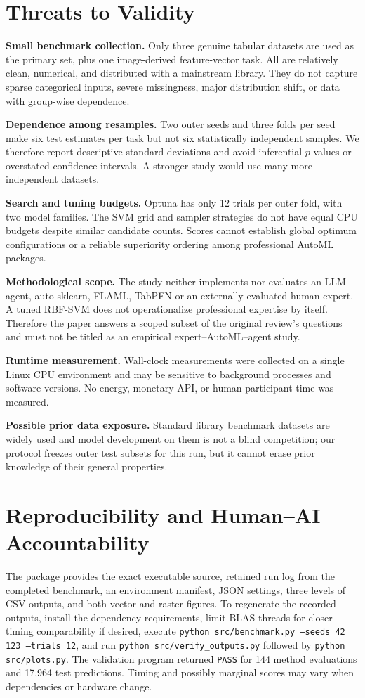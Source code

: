 \documentclass[11pt,a4paper]{article}
\begin{document}
\section{Threats to Validity}
\textbf{Small benchmark collection.} Only three genuine tabular datasets are used as the primary set, plus one image-derived feature-vector task. All are relatively clean, numerical, and distributed with a mainstream library. They do not capture sparse categorical inputs, severe missingness, major distribution shift, or data with group-wise dependence.\par
\textbf{Dependence among resamples.} Two outer seeds and three folds per seed make six test estimates per task but not six statistically independent samples. We therefore report descriptive standard deviations and avoid inferential $p$-values or overstated confidence intervals. A stronger study would use many more independent datasets.\par
\textbf{Search and tuning budgets.} Optuna has only 12 trials per outer fold, with two model families. The SVM grid and sampler strategies do not have equal CPU budgets despite similar candidate counts. Scores cannot establish global optimum configurations or a reliable superiority ordering among professional AutoML packages.\par
\textbf{Methodological scope.} The study neither implements nor evaluates an LLM agent, auto-sklearn, FLAML, TabPFN or an externally evaluated human expert. A tuned RBF-SVM does not operationalize professional expertise by itself. Therefore the paper answers a scoped subset of the original review's questions and must not be titled as an empirical expert--AutoML--agent study.\par
\textbf{Runtime measurement.} Wall-clock measurements were collected on a single Linux CPU environment and may be sensitive to background processes and software versions. No energy, monetary API, or human participant time was measured.\par
\textbf{Possible prior data exposure.} Standard library benchmark datasets are widely used and model development on them is not a blind competition; our protocol freezes outer test subsets for this run, but it cannot erase prior knowledge of their general properties.\par

\section{Reproducibility and Human--AI Accountability}
The package provides the exact executable source, retained run log from the completed benchmark, an environment manifest, JSON settings, three levels of CSV outputs, and both vector and raster figures. To regenerate the recorded outputs, install the dependency requirements, limit BLAS threads for closer timing comparability if desired, execute \texttt{python src/benchmark.py --seeds 42 123 --trials 12}, and run \texttt{python src/verify\_outputs.py} followed by \texttt{python src/plots.py}. The validation program returned \texttt{PASS} for 144 method evaluations and 17,964 test predictions. Timing and possibly marginal scores may vary when dependencies or hardware change.
\end{document}
